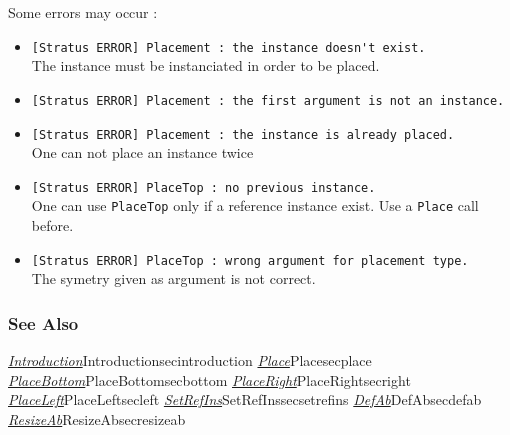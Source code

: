 Some errors may occur :    
\begin{itemize}
    \item \verb-[Stratus ERROR] Placement : the instance doesn't exist.-\\The instance must be instanciated in order to be placed.
    \item \verb-[Stratus ERROR] Placement : the first argument is not an instance.-
    \item \verb-[Stratus ERROR] Placement : the instance is already placed.-\\One can not place an instance twice    
    \item \verb-[Stratus ERROR] PlaceTop : no previous instance.-\\One can use \verb-PlaceTop- only if a reference instance exist. Use a \verb-Place- call before. 
    \item \verb-[Stratus ERROR] PlaceTop : wrong argument for placement type.-\\The symetry given as argument is not correct.
\end{itemize}

\subsubsection{See Also}

\hyperref[ref]{\emph{Introduction}}{}{Introduction}{secintroduction}
\hyperref[ref]{\emph{Place}}{}{Place}{secplace}
\hyperref[ref]{\emph{PlaceBottom}}{}{PlaceBottom}{secbottom}
\hyperref[ref]{\emph{PlaceRight}}{}{PlaceRight}{secright}
\hyperref[ref]{\emph{PlaceLeft}}{}{PlaceLeft}{secleft}
\hyperref[ref]{\emph{SetRefIns}}{}{SetRefIns}{secsetrefins}
\hyperref[ref]{\emph{DefAb}}{}{DefAb}{secdefab}
\hyperref[ref]{\emph{ResizeAb}}{}{ResizeAb}{secresizeab}
